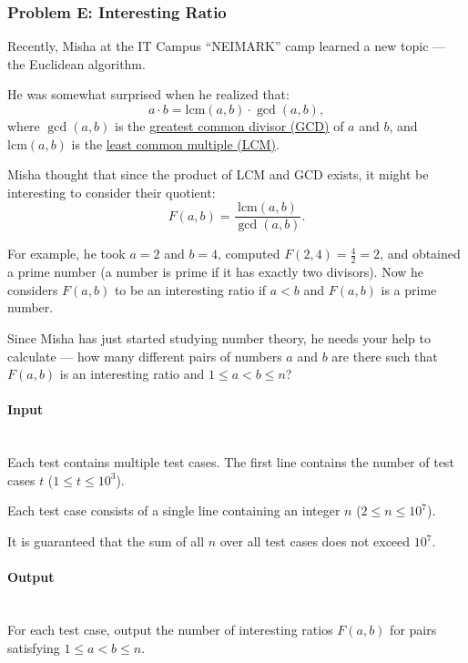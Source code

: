 \documentclass{article}
\begin{document}
\subsubsection{Problem E: Interesting Ratio}

Recently, Misha at the IT Campus ``NEIMARK'' camp learned a new topic — the Euclidean algorithm.

He was somewhat surprised when he realized that:
\[
a \cdot b = \mathrm{lcm}(a, b) \cdot \gcd(a, b),
\]
where $\gcd(a, b)$ is the \href{https://en.wikipedia.org/wiki/Greatest_common_divisor}{greatest common divisor (GCD)} of $a$ and $b$, and $\mathrm{lcm}(a, b)$ is the \href{https://en.wikipedia.org/wiki/Least_common_multiple}{least common multiple (LCM)}.

Misha thought that since the product of LCM and GCD exists, it might be interesting to consider their quotient:
\[
F(a, b) = \frac{\mathrm{lcm}(a, b)}{\gcd(a, b)}.
\]

For example, he took $a = 2$ and $b = 4$, computed $F(2, 4) = \frac{4}{2} = 2$, and obtained a prime number (a number is prime if it has exactly two divisors). Now he considers $F(a, b)$ to be an interesting ratio if $a < b$ and $F(a, b)$ is a prime number.

Since Misha has just started studying number theory, he needs your help to calculate — how many different pairs of numbers $a$ and $b$ are there such that $F(a, b)$ is an interesting ratio and $1 \le a < b \le n$?

\paragraph{Input} \mbox{} \\

Each test contains multiple test cases. The first line contains the number of test cases $t$ ($1 \le t \le 10^3$).

Each test case consists of a single line containing an integer $n$ ($2 \le n \le 10^7$).

It is guaranteed that the sum of all $n$ over all test cases does not exceed $10^7$.


\paragraph{Output}\mbox{} \\

For each test case, output the number of interesting ratios $F(a, b)$ for pairs satisfying $1 \le a < b \le n$.
\end{document}
